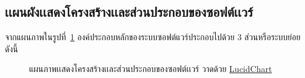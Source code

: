 \documentclass[12pt,one side,openright,a4paper]{cpe-thesis-th}
\begin{document}
    \subsection{เเผนผังเเสดงโครงสร้างเเละส่วนประกอบของซอฟต์เเวร์}
        จากแผนภาพในรูปที่~\ref{fig:comp-diagram} องค์ประกอบหลักของระบบซอฟต์แวร์ประกอบไปด้วย 3 ส่วนหรือระบบย่อยดังนี้
        \hypertarget{comp-diagram}{
            \begin{figure}[!h]
            \centering
                \caption[ภาพแผนผังเเสดงโครงสร้างเเละส่วนประกอบของซอฟต์เเวร์]{แผนภาพเเสดงโครงสร้างเเละส่วนประกอบของซอฟต์เเวร์ วาดด้วย \href{https://lucid.app/}{LucidChart}}
                \label{fig:comp-diagram}
            \end{figure}
        }
\end{document}

